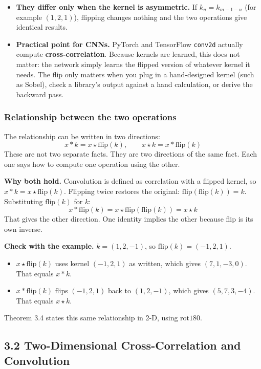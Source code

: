 \begin{itemize}
  \item \textbf{They differ only when the kernel is asymmetric.} If $k_u = k_{m-1-u}$ (for example $(1, 2, 1)$), flipping changes nothing and the two operations give identical results.
  \item \textbf{Practical point for CNNs.} PyTorch and TensorFlow \texttt{conv2d} actually compute \textbf{cross-correlation}. Because kernels are learned, this does not matter: the network simply learns the flipped version of whatever kernel it needs. The flip only matters when you plug in a hand-designed kernel (such as Sobel), check a library's output against a hand calculation, or derive the backward pass.
\end{itemize}

\subsubsection*{Relationship between the two operations}
The relationship can be written in two directions:
\[
x * k = x \star \mathrm{flip}(k), \qquad x \star k = x * \mathrm{flip}(k)
\]
These are not two separate facts. They are two directions of the same fact. Each one says how to compute one operation using the other.

\textbf{Why both hold.} Convolution is defined as correlation with a flipped kernel, so $x * k = x \star \mathrm{flip}(k)$. Flipping twice restores the original: $\mathrm{flip}(\mathrm{flip}(k)) = k$. Substituting $\mathrm{flip}(k)$ for $k$:
\[
x * \mathrm{flip}(k) = x \star \mathrm{flip}(\mathrm{flip}(k)) = x \star k
\]
That gives the other direction. One identity implies the other because flip is its own inverse.

\textbf{Check with the example.} $k = (1, 2, -1)$, so $\mathrm{flip}(k) = (-1, 2, 1)$.
\begin{itemize}
  \item $x \star \mathrm{flip}(k)$ uses kernel $(-1, 2, 1)$ as written, which gives $(7, 1, -3, 0)$. That equals $x * k$.
  \item $x * \mathrm{flip}(k)$ flips $(-1, 2, 1)$ back to $(1, 2, -1)$, which gives $(5, 7, 3, -4)$. That equals $x \star k$.
\end{itemize}
Theorem 3.4 states this same relationship in 2-D, using $\mathrm{rot180}$.


\subsection*{3.2 Two-Dimensional Cross-Correlation and Convolution}


